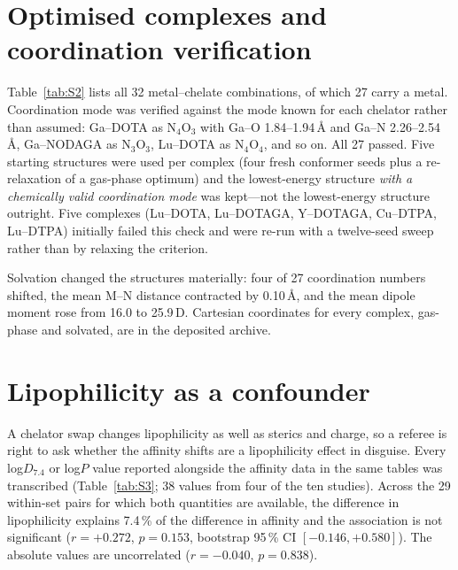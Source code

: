 \documentclass[11pt,a4paper]{article}
\begin{document}


\clearpage
\section{Optimised complexes and coordination verification}

Table~\ref{tab:S2} lists all 32 metal--chelate combinations, of which 27 carry a metal. Coordination
mode was verified against the mode known for each chelator rather than assumed: Ga--DOTA as
N$_4$O$_3$ with Ga--O 1.84--1.94\,\AA{} and Ga--N 2.26--2.54\,\AA, Ga--NODAGA as N$_3$O$_3$,
Lu--DOTA as N$_4$O$_4$, and so on. All 27 passed. Five starting structures were used per complex
(four fresh conformer seeds plus a re-relaxation of a gas-phase optimum) and the lowest-energy
structure \emph{with a chemically valid coordination mode} was kept---not the lowest-energy
structure outright. Five complexes (Lu--DOTA, Lu--DOTAGA, Y--DOTAGA, Cu--DTPA, Lu--DTPA) initially
failed this check and were re-run with a twelve-seed sweep rather than by relaxing the criterion.

Solvation changed the structures materially: four of 27 coordination numbers shifted, the mean M--N
distance contracted by 0.10\,\AA, and the mean dipole moment rose from 16.0 to 25.9\,D. Cartesian
coordinates for every complex, gas-phase and solvated, are in the deposited archive.



\clearpage
\section{Lipophilicity as a confounder}

A chelator swap changes lipophilicity as well as sterics and charge, so a referee is right to ask
whether the affinity shifts are a lipophilicity effect in disguise. Every log$D_{7.4}$ or log$P$
value reported alongside the affinity data in the same tables was transcribed (Table~\ref{tab:S3};
38 values from four of the ten studies). Across the 29 within-set pairs for which both quantities
are available, the difference in lipophilicity explains 7.4\,\% of the difference in affinity and
the association is not significant ($r = +0.272$, $p = 0.153$, bootstrap 95\,\% CI
$[-0.146, +0.580]$). The absolute values are uncorrelated ($r = -0.040$, $p = 0.838$).
\end{document}
